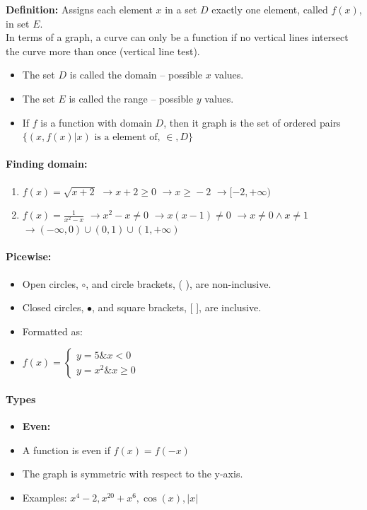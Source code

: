 \documentclass[12pt]{article}
\begin{document}
\textbf{Definition: }
Assigns each element $x$ in a set $D$ exactly one element, called $f(x)$, in set $E$.\\
In terms of a graph, a curve can only be a function if no vertical lines intersect the curve more than once (vertical line test).
\begin{itemize}
    \item The set $D$ is called the domain -- possible $x$ values.
    \item The set $E$ is called the range -- possible $y$ values.
    \item If $f$ is a function with domain $D$, then it graph is the set of ordered pairs\\
    $ \{(x, f(x) | x) \text{ is a element of, } \in{}, D\}$
\end{itemize}
\paragraph{Finding domain:}
\begin{enumerate}
    \item $f(x) = \sqrt{x+2}$
    $\rightarrow{} x + 2 \geq{} 0$
    $\rightarrow{} x \geq{} -2 $
    $\rightarrow{} [-2, +\infty)$
    
    \item $f(x) = \frac{1}{x^2-x} $
    $\rightarrow{} x^2-x \neq{} 0 $
    $\rightarrow{} x(x-1) \neq{} 0 $
    $\rightarrow{} x \neq{} 0 \wedge x \neq 1 $
    $\rightarrow{} (-\infty, 0) \cup (0, 1) \cup (1, +\infty)$
\end{enumerate}

\paragraph{Picewise:}
\begin{itemize}
    \item Open circles, $\circ$, and circle brackets, ( ), are non-inclusive.
    \item Closed circles, $\bullet$, and square brackets, [ ], are inclusive.
    \item Formatted as: 
    \item[] $f(x)=\begin{cases} 
              y=5 \& x < 0 \\
              y=x^2 \& x\geq 0 
            \end{cases}$
\end{itemize}

\paragraph{Types}
\begin{itemize}
    \item[] \textbf{Even: }
    \item A function is even if $f(x) = f(-x)$
    \item The graph is symmetric with respect to the y-axis.
    \item Examples: $x^4 - 2, x^{20}+x^6, \cos(x), |x|$

\end{itemize}
\end{document}
